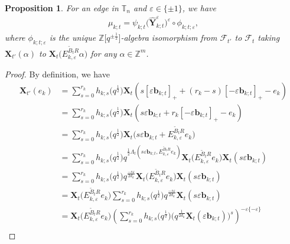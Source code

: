 \documentclass[10pt,a4paper]{amsart}
\newcommand{\Z}{\mathbb{Z}}
\numberwithin{equation}{section}
\newtheorem{Proposition}[Theorem]{Proposition}
 { \theoremstyle{definition}
\newtheorem{Definition}[Theorem]{Definition}
\newtheorem{Note}[Theorem]{Note}
\newtheorem{Example}[Theorem]{Example}
\newtheorem{Remark}[Theorem]{Remark} }
\begin{document}
\begin{Proposition}\label{quantum-decomposition}
 For an edge  in $\mathbb{T}_n$ and $\varepsilon\in \{\pm 1\}$, we have
 \begin{align}\label{eq:FG-dec-gqca}
 \mu_{k;t}=\psi_{k;t}\bigl(\mathbf{\hat{Y}}_{k;t}^{\varepsilon}\bigr)^{\varepsilon}\circ\phi_{k;t;\varepsilon},
 \end{align}
 where $\phi_{k;t;\varepsilon}$ is the unique $\Z\big[q^{\pm\!\frac{1}{2}}\big]$-algebra isomorphism from $\mathcal{F}_{t'}$ to $\mathcal{F}_{\!t}$ taking $\mathbf{X}_{\!t'}(\alpha)$ to $\mathbf{X}_{t}\bigl(E_{\!k,\varepsilon}^{\tilde{B}_{t}R}\alpha\bigr)$ for any $\alpha\in\mathbb{Z}^{m}$.
\end{Proposition}
\begin{proof}
 By definition, we have
 \begin{align*}
 \mathbf{X}_{t'}(e_{k})
 &=\sum\limits^{r_{k}}_{s=0}h_{k;s}\bigl(q^{\frac{1}{2}}\bigr)\mathbf{X}_{t}(s[\varepsilon\mathbf{b}_{k;t}]_{+}+(r_{k}-s)[-\varepsilon\mathbf{b}_{k;t}]_{+}-e_{k})\\
 & =\sum\limits^{r_{k}}_{s=0}h_{k;s}\bigl(q^{\frac{1}{2}}\bigr)\mathbf{X}_{t}(s\varepsilon\mathbf{b}_{k;t}+r_{k}[-\varepsilon\mathbf{b}_{k;t}]_{+}-e_{k})\\
 &=\sum\limits^{r_{k}}_{s=0}h_{k;s}\bigl(q^{\frac{1}{2}}\bigr)\mathbf{X}_{t}\bigl(s\varepsilon\mathbf{b}_{k;t}+E_{k,\varepsilon}^{\tilde{B}_{t}R}e_{k}\bigr)\\
 &=\sum\limits^{r_{k}}_{s=0}h_{k;s}\bigl(q^{\frac{1}{2}}\bigr)q^{\frac{1}{2}\Lambda_{t}(s\varepsilon\mathbf{b}_{k;t},E_{k,\varepsilon}^{\tilde{B}_{t}R}e_{k})}\mathbf{X}_{t}\bigl(E^{\tilde{B}_{t}R}_{k,\varepsilon}e_{k}\bigr)\mathbf{X}_{t}(s\varepsilon\mathbf{b}_{k;t})\\
 &=\sum\limits^{r_{k}}_{s=0}h_{k;s}\bigl(q^{\frac{1}{2}}\bigr)q^{\frac{-s\varepsilon}{2d_{k}}}\mathbf{X}_{t}\bigl(E^{\tilde{B}_{t}R}_{k,\varepsilon}e_{k}\bigr)\mathbf{X}_{t}(s\varepsilon\mathbf{b}_{k;t})\\
 &=\mathbf{X}_{t}\bigl(E^{\tilde{B}_{t}R}_{k,\varepsilon}e_{k}\bigr)\sum\limits^{r_{k}}_{s=0}h_{k;s}\bigl(q^{\frac{1}{2}}\bigr)q^{\frac{-s\varepsilon}{2d_{k}}}\mathbf{X}_{t}(s\varepsilon\mathbf{b}_{k;t})\\
 &=\mathbf{X}_{t}\bigl(E^{\tilde{B}_{t}R}_{k,\varepsilon}e_{k}\bigr)\left(\sum\limits^{r_{k}}_{s=0}h_{k;s}\bigl(q^{\frac{1}{2}}\bigr)\bigl(q^{\frac{1}{2d_{k}}}\mathbf{X}_{t}(\varepsilon\mathbf{b}_{k;t})\bigr)^{s}\right)^{-\varepsilon\{-\varepsilon\}}\\

\end{align*}
\end{proof}
\end{document}
